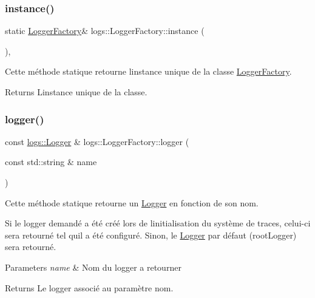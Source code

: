 \subsubsection{\texorpdfstring{instance()}{instance()}}
{\footnotesize\ttfamily static \hyperlink{classlogs_1_1LoggerFactory}{Logger\+Factory}\& logs\+::\+Logger\+Factory\+::instance (\begin{DoxyParamCaption}{ }\end{DoxyParamCaption})\hspace{0.3cm}{\ttfamily [inline]}, {\ttfamily [static]}}



Cette méthode statique retourne l\textquotesingle{}instance unique de la classe \hyperlink{classlogs_1_1LoggerFactory}{Logger\+Factory}. 

\begin{DoxyReturn}{Returns}
L\textquotesingle{}instance unique de la classe. 
\end{DoxyReturn}
\mbox{\label{classlogs_1_1LoggerFactory_a82585b5de73e471e06cafdccc3b3721e}} 
\subsubsection{\texorpdfstring{logger()}{logger()}}
{\footnotesize\ttfamily const \hyperlink{classlogs_1_1Logger}{logs\+::\+Logger} \& logs\+::\+Logger\+Factory\+::logger (\begin{DoxyParamCaption}\item[{const std\+::string \&}]{name }\end{DoxyParamCaption})\hspace{0.3cm}{\ttfamily [static]}}



Cette méthode statique retourne un \hyperlink{classlogs_1_1Logger}{Logger} en fonction de son nom. 

Si le logger demandé a été créé lors de l\textquotesingle{}initialisation du système de traces, celui-\/ci sera retourné tel qu\textquotesingle{}il a été configuré. Sinon, le \hyperlink{classlogs_1_1Logger}{Logger} par défaut (root\+Logger) sera retourné.


\begin{DoxyParams}{Parameters}
{\em name} & Nom du logger a retourner \\
\hline
\end{DoxyParams}
\begin{DoxyReturn}{Returns}
Le logger associé au paramètre {\ttfamily nom}. 
\end{DoxyReturn}
\mbox{\label{classlogs_1_1LoggerFactory_a212aa623f4b6bee12cb39e8017dde670}} 
